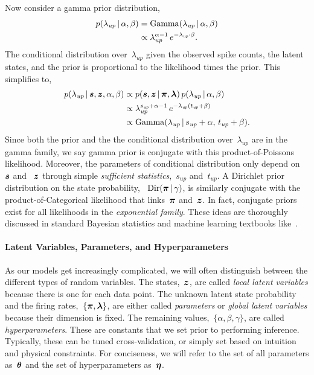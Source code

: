 Now consider a gamma prior distribution,
\begin{align*}
  p(\lambda_{\textit{up}} \,|\, \alpha, \beta)
  &= \mathrm{Gamma}(\lambda_{\textit{up}} \,|\, \alpha, \beta) \\
  &\propto \lambda_{\textit{up}}^{\alpha - 1} \,
  e^{-\lambda_{\textit{up}} \cdot \beta}.
\end{align*}
The conditional distribution over~$\lambda_{\textit{up}}$ given the
observed spike counts, the latent states, and the prior is
proportional to the likelihood times the prior. This simplifies to,
\begin{align*}
  p(\lambda_{\textit{up}} \,|\, \boldsymbol{s}, \boldsymbol{z}, \alpha, \beta)
  &\propto p(\boldsymbol{s}, \boldsymbol{z} \,|\, \boldsymbol{\pi}, \boldsymbol{\lambda}) \,
  p(\lambda_{\textit{up}} \,|\, \alpha, \beta) \\
  &\propto \lambda_{\textit{up}}^{s_{\textit{up}} + \alpha - 1} \,
  e^{-\lambda_{\textit{up}} (t_{\textit{up}} +\beta)} \\
  &\propto \mathrm{Gamma}(\lambda_{\textit{up}} \,|\,
  s_{\textit{up}} + \alpha, \,
  t_{\textit{up}} + \beta).
\end{align*}
Since both the prior and the the conditional distribution
over~$\lambda_{\textit{up}}$ are in the gamma family, we say gamma
prior is conjugate with this product-of-Poissons likelihood.
Moreover, the parameters of conditional distribution only depend
on~$\boldsymbol{s}$ and ~$\boldsymbol{z}$ through simple \emph{sufficient
  statistics},~$s_{\textit{up}}$ and~$t_{\textit{up}}$. A Dirichlet
prior distribution on the state probability, ~${\mathrm{Dir}(\boldsymbol{\pi}
  \,|\, \gamma)}$, is similarly conjugate with the
product-of-Categorical likelihood that links~$\boldsymbol{\pi}$ and~$\boldsymbol{z}$.  In
fact, conjugate priors exist for all likelihoods in the
\emph{exponential family}. These ideas are thoroughly discussed in
standard Bayesian statistics and machine learning textbooks
like~\citet{Gelman13, Murphy-2012}.


\paragraph{Latent Variables, Parameters, and Hyperparameters}
As our models get increasingly complicated, we will often distinguish
between the different types of random variables. The states,~$\boldsymbol{z}$,
are called \emph{local latent variables} because there is one for each
data point.  The unknown latent state probability and the
firing rates,~${ \{\boldsymbol{\pi}, \boldsymbol{\lambda}\} }$, are either called \emph{parameters} or
\emph{global latent variables} because their dimension is fixed. The
remaining values,~${\{ \alpha, \beta, \gamma \} }$,
are called \emph{hyperparameters}. These are constants that we set
prior to performing inference.  Typically, these can be tuned
cross-validation, or simply set based on intuition and physical
constraints. For conciseness, we will refer to the set of
all parameters as~$\boldsymbol{\theta}$ and the set of hyperparameters
as~$\boldsymbol{\eta}$.



